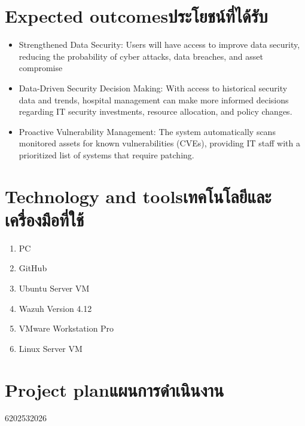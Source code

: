 \section{\ifenglish Expected outcomes\else ประโยชน์ที่ได้รับ\fi}
\begin{itemize}
    \item{Strengthened Data Security: Users will have access to improve data security, reducing the probability of cyber attacks, data breaches, and asset compromise}
    \item{Data-Driven Security Decision Making: With access to historical security data and trends, hospital management can make more informed decisions regarding IT security investments, resource allocation, and policy changes.}
    \item{Proactive Vulnerability Management: The system automatically scans monitored assets for known vulnerabilities (CVEs), providing IT staff with a prioritized list of systems that require patching.}
\end{itemize}

\section{\ifenglish Technology and tools\else เทคโนโลยีและเครื่องมือที่ใช้\fi}
\begin{enumerate}
    \item{PC}
    \item{GitHub}
    \item{Ubuntu Server VM}
    \item{Wazuh Version 4.12}
    \item{VMware Workstation Pro}
    \item{Linux Server VM}
\end{enumerate}

\section{\ifenglish Project plan\else แผนการดำเนินงาน\fi}

\begin{plan}{6}{2025}{3}{2026}
\end{plan}


